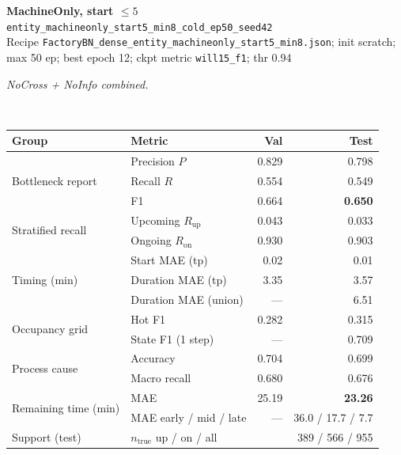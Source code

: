 \documentclass[9pt,a4paper,twocolumn]{extarticle}
\begin{document}
\noindent\begin{minipage}{\columnwidth}
\begin{center}
{\small\bfseries MachineOnly, start $\le 5$}\\
{\scriptsize\texttt{entity\_machineonly\_start5\_min8\_cold\_ep50\_seed42}}\\
{\scriptsize Recipe \texttt{FactoryBN\_dense\_entity\_machineonly\_start5\_min8.json}; init scratch; max 50 ep; best epoch 12; ckpt metric \texttt{will15\_f1}; thr 0.94}\\[1pt]
\parbox{0.96\columnwidth}{\scriptsize\itshape NoCross + NoInfo combined.}\\[2pt]
\scriptsize\setlength{\tabcolsep}{3pt}
\begin{tabular}{llrr}
\toprule
Group & Metric & Val & Test \\
\midrule
\multirow{3}{*}{Bottleneck report}
  & Precision $P$ & 0.829 & 0.798 \\
  & Recall $R$ & 0.554 & 0.549 \\
  & F1 & 0.664 & \textbf{0.650} \\
\midrule
\multirow{2}{*}{Stratified recall}
  & Upcoming $R_{\mathrm{up}}$ & 0.043 & 0.033 \\
  & Ongoing $R_{\mathrm{on}}$ & 0.930 & 0.903 \\
\midrule
\multirow{3}{*}{Timing (min)}
  & Start MAE (tp) & 0.02 & 0.01 \\
  & Duration MAE (tp) & 3.35 & 3.57 \\
  & Duration MAE (union) & --- & 6.51 \\
\midrule
\multirow{2}{*}{Occupancy grid}
  & Hot F1 & 0.282 & 0.315 \\
  & State F1 (1 step) & --- & 0.709 \\
\midrule
\multirow{2}{*}{Process cause}
  & Accuracy & 0.704 & 0.699 \\
  & Macro recall & 0.680 & 0.676 \\
\midrule
\multirow{2}{*}{Remaining time (min)}
  & MAE & 25.19 & \textbf{23.26} \\
  & MAE early / mid / late & --- & 36.0 / 17.7 / 7.7 \\
\midrule
Support (test)
  & $n_{\mathrm{true}}$ up / on / all & \multicolumn{2}{r}{389 / 566 / 955} \\
\bottomrule
\end{tabular}
\end{center}
\end{minipage}\par\vspace{6pt}
\end{document}
